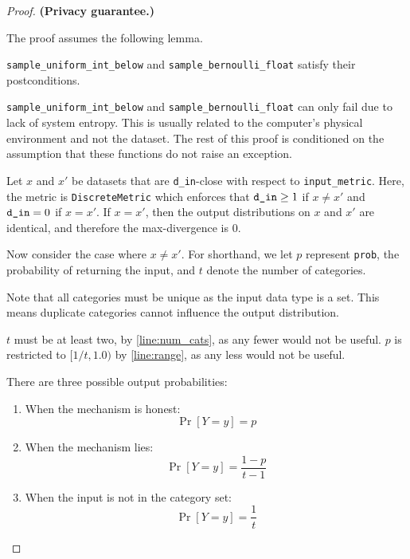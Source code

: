 \documentclass{article}
\begin{document}
\begin{proof} 
\textbf{(Privacy guarantee.)} 
    
\begin{tcolorbox}
    The proof assumes the following lemma.
    \begin{lemma}
        \texttt{sample\_uniform\_int\_below} and \texttt{sample\_bernoulli\_float} satisfy their postconditions.
    \end{lemma}
\end{tcolorbox}

\texttt{sample\_uniform\_int\_below} and \texttt{sample\_bernoulli\_float} can only fail due to lack of system entropy. 
This is usually related to the computer's physical environment and not the dataset. 
The rest of this proof is conditioned on the assumption that these functions do not raise an exception. 

Let $x$ and $x'$ be datasets that are \texttt{d\_in}-close with respect to \texttt{input\_metric}.
Here, the metric is \texttt{DiscreteMetric} which enforces that $\texttt{d\_in} \geq 1$ if $x \ne x'$ and $\texttt{d\_in} = 0$ if $x = x'$. 
If $x = x'$, then the output distributions on $x$ and $x'$ are identical, and therefore the max-divergence is 0.

Now consider the case where $x \ne x'$. 
For shorthand, we let $p$ represent \texttt{prob}, the probability of returning the input,
and $t$ denote the number of categories.

Note that all categories must be unique as the input data type is a set.
This means duplicate categories cannot influence the output distribution.

$t$ must be at least two, by \ref{line:num_cats}, as any fewer would not be useful.
$p$ is restricted to $[1/t, 1.0)$ by \ref{line:range}, as any less would not be useful.

There are three possible output probabilities:

\begin{enumerate}
    \item When the mechanism is honest: 
    \[
        \Pr[Y = y] = p
    \]

    \item When the mechanism lies: 
    \[
        \Pr[Y = y] = \frac{1 - p}{t - 1}
    \]

    \item When the input is not in the category set: 
    \[
        \Pr[Y = y] = \frac{1}{t}
    \]
\end{enumerate}


\end{proof}
\end{document}

